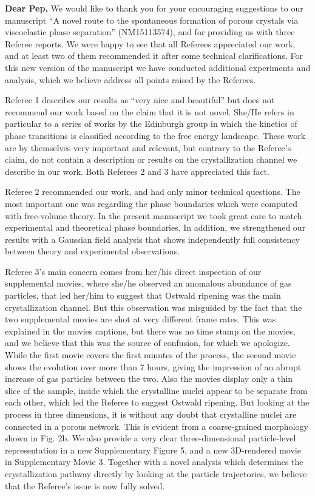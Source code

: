 \documentclass[11pt,a4paper]{article}
\begin{document}




\noindent
{\bf Dear Pep,}
\vskip 0.3cm
We would like to thank you for your encouraging suggestions to our manuscript 
``A novel route to the spontaneous formation of porous crystals via viscoelastic phase separation'' (NM15113574),
and for providing us with three Referee reports. 
We were happy to see that all Referees appreciated our work, and at least two of them recommended it after some technical clarifications.
For this new version of the manuscript we have conducted additional experiments and analysis,
which we believe address all points raised by the Referees.

Referee 1 describes our results as ``very nice and beautiful'' but does not recommend our work
based on the claim that it is not novel. She/He refers in particular to a series of works by the Edinburgh group in which the kinetics of phase
transitions is classified according to the free energy landscape. These work are by themselves very important and relevant, but contrary
to the Referee's claim, do not contain a description or results on the crystallization channel we describe in our work.
Both Referees 2 and 3 have appreciated this fact.

Referee 2 recommended our work, and had only minor technical questions. The most important one was regarding the phase boundaries
which were computed with free-volume theory. In the present manuscript we took great care to match experimental and theoretical phase boundaries. In addition, we strengthened our results with a Gaussian field analysis that shows independently full consistency between theory and experimental observations.

Referee 3's main concern comes from her/his direct inspection of our supplemental movies, where she/he observed an anomalous abundance
of gas particles, that led her/him to suggest that Ostwald ripening was the main crystallization channel. But this observation
was misguided by the fact that the two supplemental movies are shot at very different frame rates. This was explained in the movies captions,
but there was no time stamp on the movies, and we believe that this was the source of confusion, for which we apologize. While the first movie covers
the first minutes of the process, the second movie shows the evolution over more than 7 hours, giving the impression
of an abrupt increase of gas particles between the two. Also the movies display only a thin slice of the sample, inside which
the crystalline nuclei appear to be separate from each other, which led the Referee to suggest Ostwald ripening. But looking at the process in three dimensions,
it is without any doubt that crystalline nuclei are connected in a porous network. This is evident from a coarse-grained morphology shown in Fig. 2b. 
We also provide a very clear three-dimensional particle-level representation in a new Supplementary Figure 5, and a new 3D-rendered movie in Supplementary Movie 3.  
Together with a novel analysis which determines the crystallization pathway directly by looking 
at the particle trajectories, we believe that the Referee's issue is now fully solved. 
\end{document}
